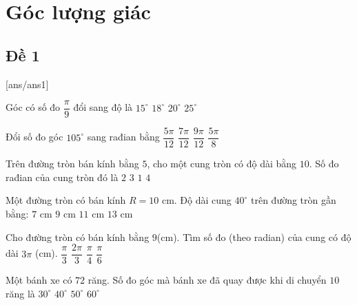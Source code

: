 \section{Góc lượng giác}

\subsection{Đề 1 }
[ans/ans1]
\caulc
\begin{ex} %
	Góc có số đo $\dfrac{\pi}{9}$ đổi sang độ là
	\choice
	{$15^{\circ}$}
	{$18^{\circ}$}
	{\True $20^{\circ}$}
	{$25^{\circ}$}
\end{ex}

\begin{ex}%
	Đổi số đo góc $105^{\circ}$ sang rađian bằng
	\choice
	{$\dfrac{5\pi}{12}$}
	{\True $\dfrac{7\pi}{12}$}
	{$\dfrac{9\pi}{12}$}
	{$\dfrac{5\pi}{8}$}
	\loigiai{
		\[105^{\circ}=\dfrac{105^{\circ}\cdot \pi}{180^{\circ}}=\dfrac{7\pi}{12}.
		\]
	}
\end{ex}

\begin{ex}%
	Trên đường tròn bán kính bằng $5$, cho một cung tròn có độ dài bằng $ 10$. Số đo rađian của cung tròn đó là
	\choice
	{\True $2$}
	{$3$}
	{$1$}
	{$4$}
\end{ex}

\begin{ex}%
	Một đường tròn có bán kính $R=10$ cm. Độ dài cung $40^{\circ}$ trên đường tròn gần bằng:
	\choice
	{\True $7$ cm}
	{$9$ cm}
	{$11$ cm}
	{$13$ cm}
\end{ex}

\begin{ex} %
	Cho đường tròn có bán kính bằng $9$(cm). Tìm số đo (theo radian) của cung có độ dài $3\pi$ (cm).
	\choice
	{\True $\dfrac{\pi}{3}$}
	{$\dfrac{2\pi}{3}$}
	{$\dfrac{\pi}{4}$}
	{$\dfrac{\pi}{6}$}
	\loigiai{
		\[l=R\alpha \Rightarrow \alpha=\dfrac{l}{R}=\dfrac{3\pi}{9}=\dfrac{\pi}{3}.
		\]
	}
\end{ex}
\begin{ex}%
	Một bánh xe có $72$ răng. Số đo góc mà bánh xe đã quay được khi di chuyển $10$ răng là
	\choice
	{$30^\circ$}
	{$40^\circ$}
	{\True $50^\circ$}
	{$60^\circ$}
\end{ex}

